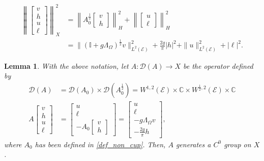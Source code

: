 \documentclass{amsart} %
\numberwithin{equation}{section}
\newtheorem{lemma}[theorem]{Lemma}
\theoremstyle{definition}
\begin{document}
\begin{equation}
\begin{aligned}
\left\|\begin{bmatrix}
v\\
h\\
u\\
\ell
\end{bmatrix}\right\|_X^2&=\left\| A_0^{\frac12}\begin{bmatrix}
v\\
h
\end{bmatrix}
\right\|_H^2+\left\|\begin{bmatrix}
u\\
\ell
\end{bmatrix}\right\|_H^2\\
&=\|(\mathbb{I}+g\Lambda_{\Omega})^{\frac12}v\|_{L^2(\mathcal{E})}^2+\frac{2g}{\pi}|h|^2+\|u\|_{L^2(\mathcal{E})}^2+|\ell|^2.
\end{aligned}
\end{equation}
\begin{lemma}\label{A_generates_group}
With the above notation,
let $A:\mathcal{D}(A)\to X$ be the operator defined by
\begin{equation}\label{def_op_A}
\begin{aligned}
 \mathcal{D}(A)&=\mathcal{D}(A_0)\times\mathcal{D}(A_0^{\frac12})=W^{1,2}(\mathcal{E})\times\mathbb{C}\times W^{\frac12,2}(\mathcal{E})\times\mathbb{C}\\
 A\begin{bmatrix}
 v\\
 h\\
 u\\
 \ell
 \end{bmatrix}&=\begin{bmatrix}
 u\\
 \ell\\
 -A_0\begin{bmatrix}
 v\\
 h
 \end{bmatrix}
 \end{bmatrix}=\begin{bmatrix}
 u\\
 \ell\\
 -g\Lambda_{\Omega}v\\
 -\frac{2g}{\pi}h
 \end{bmatrix},
\end{aligned}
\end{equation}
where $A_0$ has been defined in \eqref{def_non_cup}.
Then, $A$ generates a $C^0$ group on $X$.
\end{lemma}
\end{document}
